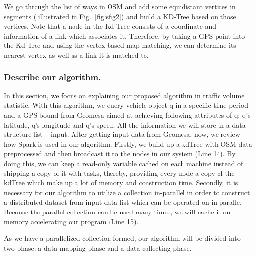 \documentclass{acm_proc_article-sp}
\begin{document}
	
	\setlength{\parindent}{0.7cm} We go through the list of ways in OSM and add some equidistant vertices in segments ( illustrated in Fig.~\ref{fig:sfig2}) and build a KD-Tree based on those vertices. Note that a node in the Kd-Tree consists of a coordinate and information of a link which associates it. Therefore, by taking a GPS point into the Kd-Tree and using the vertex-based map matching, we can determine its nearest vertex as well as a link it is matched to.
	
	\subsubsection{Describe our algorithm.}
		
	\setlength{\parindent}{0.7cm} In this section, we focus on explaining our proposed algorithm in traffic volume statistic. With this algorithm, we query vehicle object q in a specific time period and a GPS bound from Geomesa aimed at achieving following attributes of q: q’s latitude, q’s longitude and q’s speed. All the information we will store in a data structure list – input. After getting input data from Geomesa, now, we review how Spark is used in our algorithm. Firstly, we build up a kdTree with OSM data preprocessed and then broadcast it to the nodes in our system (Line 14). By doing this, we can keep a read-only variable cached on each machine instead of shipping a copy of it with tasks, thereby, providing every node a copy of the kdTree which make up a lot of memory and construction time. Secondly, it is necessary for our algorithm to utilize a collection in-parallel in order to construct a distributed dataset from input data list which can be operated on in paralle. Because the parallel collection can be used many times, we will cache it on memory accelerating our program (Line 15).
	
\setlength{\parindent}{0.7cm} As we have a parallelized collection formed, our algorithm will be divided into two phase: a data mapping phase and a data collecting phase. 
\end{document}

